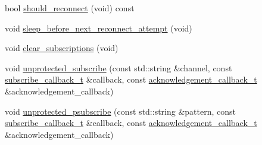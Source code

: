 \begin{DoxyCompactItemize}
\item 
bool \hyperlink{classcpp__redis_1_1subscriber_a87b9daaeed9872a0bc65438729b1211e}{should\+\_\+reconnect} (void) const
\item 
void \hyperlink{classcpp__redis_1_1subscriber_aa4a227745820990bfed151f51376ac54}{sleep\+\_\+before\+\_\+next\+\_\+reconnect\+\_\+attempt} (void)
\item 
void \hyperlink{classcpp__redis_1_1subscriber_a1be9e272e3b9d382e9b6c75c0c4bce70}{clear\+\_\+subscriptions} (void)
\item 
void \hyperlink{classcpp__redis_1_1subscriber_adc7f57c1c2cba9b213ce251b2b736550}{unprotected\+\_\+subscribe} (const std\+::string \&channel, const \hyperlink{classcpp__redis_1_1subscriber_ac6ab8ebc526d784e4b79a39bbd73dca8}{subscribe\+\_\+callback\+\_\+t} \&callback, const \hyperlink{classcpp__redis_1_1subscriber_a19ea39dfabeb19937a9ce4c8d21781b4}{acknowledgement\+\_\+callback\+\_\+t} \&acknowledgement\+\_\+callback)
\item 
void \hyperlink{classcpp__redis_1_1subscriber_a4c711c3fda605cb286f14bb25b205b7d}{unprotected\+\_\+psubscribe} (const std\+::string \&pattern, const \hyperlink{classcpp__redis_1_1subscriber_ac6ab8ebc526d784e4b79a39bbd73dca8}{subscribe\+\_\+callback\+\_\+t} \&callback, const \hyperlink{classcpp__redis_1_1subscriber_a19ea39dfabeb19937a9ce4c8d21781b4}{acknowledgement\+\_\+callback\+\_\+t} \&acknowledgement\+\_\+callback)
\end{DoxyCompactItemize}
